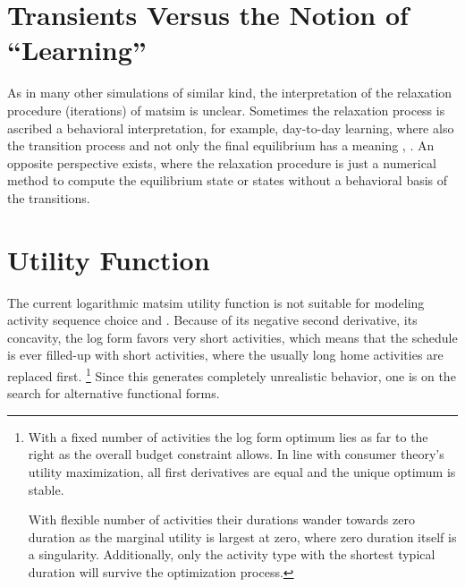 \section{Transients Versus the Notion of \enquote{Learning}}
\label{sec:transients-vs-learning}
As in many other simulations of similar kind, the interpretation of the relaxation procedure (iterations) of \gls{matsim} is unclear. 
%
Sometimes the relaxation process is ascribed a behavioral interpretation, for example, day-to-day learning, where also the transition process and not only the final equilibrium has a meaning \citep[][p.128]{LiuEtAl_TransResA_2006}, \citep[][p.523]{NagelBarrett1997feedback}. 
%
An opposite perspective exists, where the relaxation procedure is just a numerical method to compute the equilibrium state or states without a behavioral basis of the transitions.

\section{Utility Function}
\label{sec:future-of-scoring-function}
The current logarithmic \gls{matsim} utility function is not suitable for modeling activity sequence choice \citet[][p.127f]{Feil_PhDThesis_2010} and \citet[][]{MATSim_Userguide_2015}. 
Because of its negative second derivative, \ie its concavity, the log form favors very short activities, which means that the schedule is ever filled-up with short activities, where the usually long home activities are replaced first.%
\footnote{
With a fixed number of activities the log form optimum lies as far to the right as the overall budget constraint allows. 
In line with consumer theory's utility maximization, all first derivatives are equal and the unique optimum is stable.

With flexible number of activities their durations wander towards zero duration as the marginal utility is largest at zero, where zero duration itself is a singularity. 
Additionally, only the activity type with the shortest typical duration will survive the optimization process.} 
%
Since this generates completely unrealistic behavior, one is on the search for alternative functional forms. 


